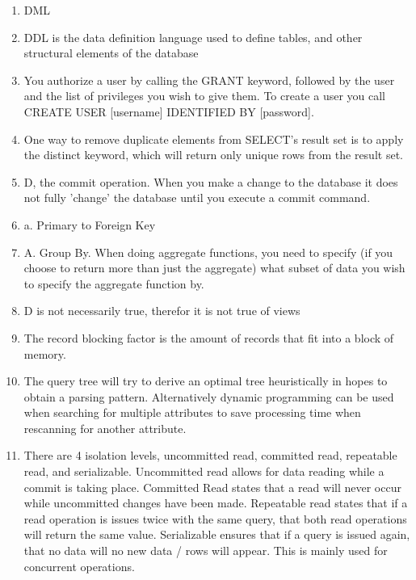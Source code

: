 \documentclass[12pt]{article}
\begin{document}
\begin{enumerate}
	\item DML
	
	\item DDL is the data definition language used to define tables, and other structural elements of the database
	
	\item You authorize a user by calling the GRANT keyword, followed by the user and the list of privileges you wish to give them. To create a user
you call CREATE USER [username] IDENTIFIED BY [password].

	\item One way to remove duplicate elements from SELECT's result set is to apply the distinct keyword, which will return only unique rows from the result set.

	\item D, the commit operation. When you make a change to the database it does not fully 'change' the database until you execute a commit command.

	\item a. Primary to Foreign Key
	
	\item A. Group By. When doing aggregate functions, you need to specify (if you choose to return more than just the aggregate) what subset of data you wish to specify the aggregate function by.
	
	\item D is not necessarily true, therefor it is not true of views
	
	\item The record blocking factor is the amount of records that fit into a block of memory.
	
	\item The query tree will try to derive an optimal tree heuristically in hopes to obtain a parsing pattern. Alternatively dynamic programming can be used when searching for multiple attributes to save processing time when rescanning for another attribute.
	
	\item There are 4 isolation levels, uncommitted read, committed read, repeatable read, and serializable.
Uncommitted read allows for data reading while a commit is taking place. Committed Read states that
a read will never occur while uncommitted changes have been made. Repeatable read states that if a
read operation is issues twice with the same query, that both read operations will return the same value.
Serializable ensures that if a query is issued again, that no data will no new data / rows will appear.
This is mainly used for concurrent operations.


\end{enumerate}
\end{document}
